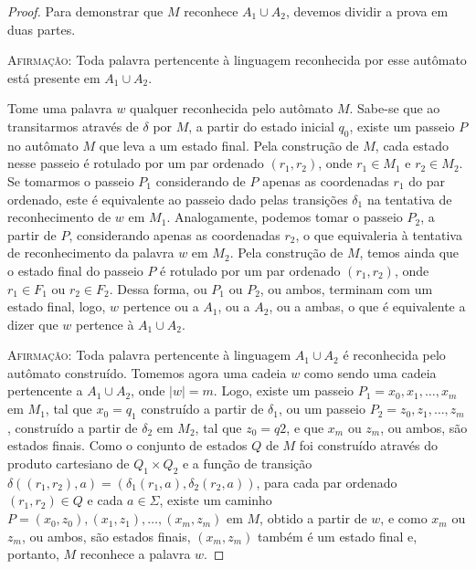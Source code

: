 \begin{proof}
Para demonstrar que $M$ reconhece $A_1 \cup A_2$, devemos dividir a prova em duas partes.

\textsc{Afirmação:} Toda palavra pertencente à linguagem reconhecida por esse autômato está presente em $A_1 \cup A_2$.

Tome uma palavra $w$ qualquer reconhecida pelo autômato $M$. Sabe-se que ao transitarmos através de $\delta$ por $M$, a partir do estado inicial $q_0$, existe um passeio $P$ no autômato $M$ que leva a um estado final. Pela construção de $M$, cada estado nesse passeio é rotulado por um par ordenado $(r_1, r_2)$, onde $r_1 \in M_1$ e $r_2 \in M_2$. Se tomarmos o passeio $P_1$ considerando de $P$ apenas as coordenadas $r_1$ do par ordenado, este é equivalente ao passeio dado pelas transições $\delta_1$ na tentativa de reconhecimento de $w$ em $M_1$. Analogamente, podemos tomar o passeio $P_2$, a partir de $P$, considerando apenas as coordenadas $r_2$, o que equivaleria à tentativa de reconhecimento da palavra $w$ em $M_2$. Pela construção de $M$, temos ainda que o estado final do passeio $P$ é rotulado por um par ordenado $(r_1, r_2)$, onde $r_1 \in F_1$ ou $r_2 \in F_2$. Dessa forma, ou $P_1$ ou $P_2$, ou ambos, terminam com um estado final, logo, $w$ pertence ou a $A_1$, ou a $A_2$, ou a ambas, o que é equivalente a dizer que $w$ pertence à $A_1 \cup A_2$.

\textsc{Afirmação:} Toda palavra pertencente à linguagem $A_1 \cup A_2$ é reconhecida pelo autômato construído.
Tomemos agora uma cadeia $w$ como sendo uma cadeia pertencente a $A_1 \cup A_2$, onde $|w| = m$. Logo, existe um passeio $P_1 = x_0, x_1, \ldots, x_m$ em $M_1$, tal que $x_0 = q_1$ construído a partir de $\delta_1$, ou um passeio $P_2 = z_0, z_1, \ldots, z_m$, construído a partir de $\delta_2$ em $M_2$, tal que $z_0 = q2$, e que $x_m$ ou $z_m$, ou ambos, são estados finais. Como o conjunto de estados $Q$ de $M$ foi construído através do produto cartesiano de $Q_1 \times Q_2$ e a função de transição $\delta((r_1, r_2), a) = (\delta_1(r_1, a), \delta_2(r_2, a))$, para cada par ordenado $(r_1, r_2) \in Q$ e cada $a \in \Sigma$, existe um caminho $P = (x_0, z_0), (x_1, z_1), \ldots, (x_m,z_m)$ em $M$, obtido a partir de $w$, e como $x_m$ ou $z_m$, ou ambos, são estados finais, $(x_m, z_m)$ também é um estado final e, portanto, $M$ reconhece a palavra $w$.
\end{proof}